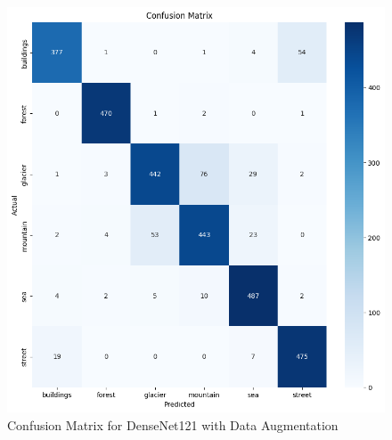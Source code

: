 \documentclass[conference]{IEEEtran}
\begin{document}
\begin{figure}[H]
    \centering
    \includegraphics[width=1\linewidth]{images//DenseNet/ConfusionMatrix_DenseNet_Data_Augmented.png}
    \caption{Confusion Matrix for DenseNet121 with Data Augmentation}
    \label{fig:CM_Desenet_DA}
\end{figure}
\end{document}
